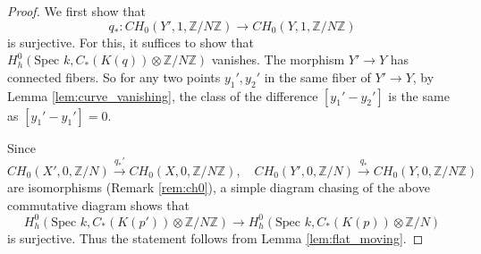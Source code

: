 \documentclass{amsart}
\theoremstyle{definition}
\theoremstyle{remark}
\newcommand{\mbb}{\mathbb}
\newcommand{\ZZ}{\mbb{Z}}
\newcommand{\SP}{\text{Spec }}
\begin{document}
\begin{proof}
We first show that 
\[
q_*: CH_0(Y', 1, \ZZ/N\ZZ)  \to CH_0(Y, 1, \ZZ/N\ZZ) 
\]
is surjective. For this, it suffices to show that $H_h^{0}(\SP k, C_*(K(q))\otimes \ZZ/N\ZZ)$ vanishes.
The morphism $Y' \to Y$ has connected fibers. 
So for any two points $y_1', y_2'$ in the same fiber of $Y' \to Y$, by Lemma \ref{lem:curve_vanishing}, the class of the difference $[y_1'-y_2']$ is the same as $[y_1'-y_1']=0$.


Since
\[
CH_0(X', 0, \ZZ/N)  \xrightarrow{q_*'} CH_0(X, 0, \ZZ/N\ZZ), \quad
CH_0(Y', 0, \ZZ/N)  \xrightarrow{q_*} CH_0(Y, 0, \ZZ/N\ZZ) 
\]
are isomorphisms (Remark \ref{rem:ch0}), a simple diagram chasing of the above commutative diagram shows that
\[
H_h^{0}(\SP k, C_*(K(p'))\otimes \ZZ/N\ZZ) \to H_h^{0}(\SP k, C_*(K(p))\otimes \ZZ/N)
\]
is surjective.
Thus the statement follows from Lemma \ref{lem:flat_moving}.
\end{proof}
\end{document}
